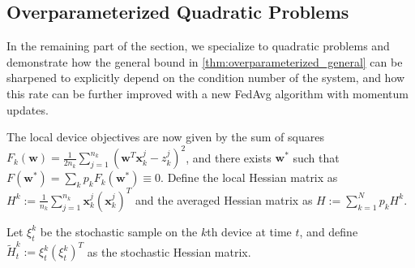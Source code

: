 \subsection{Overparameterized Quadratic Problems}

In the remaining part of the section, we specialize to quadratic problems
and demonstrate how the general bound in \ref{thm:overparameterized_general}
can be sharpened to explicitly depend on the condition number of the
system, and how this rate can be further improved with a new FedAvg
algorithm with momentum updates. 

The local device objectives are now given by the sum of squares $F_{k}(\mathbf{w})=\frac{1}{2n_{k}}\sum_{j=1}^{n_{k}}(\mathbf{w}^{T}\mathbf{x}_{k}^{j}-z_{k}^{j})^{2}$,
and there exists $\mathbf{w}^{\ast}$ such that $F(\mathbf{w}^{\ast})=\sum_{k}p_{k}F_{k}(\mathbf{w}^{\ast})\equiv0$.
Define the local Hessian matrix as $H^{k}:=\frac{1}{n_{k}}\sum_{j=1}^{n_{k}}\mathbf{x}_{k}^{j}(\mathbf{x}_{k}^{j})^{T}$
and the averaged Hessian matrix as $H:=\sum_{k=1}^{N}p_{k}H^{k}$.
\begin{comment}
In general $H$ has zero eigevalues. However, because the null space
of $H$ and range of $H$ are orthogonal, in our subsequence analysis
it suffices to project $\overline{\mathbf{w}}_{t}-\mathbf{w}^{\ast}$
onto the range of $H$, thus we may restrict to the non-zero eigenvalue
of $H$. We can use $\mathbf{w}^{\ast T}\mathbf{x}_{k}^{j}-z_{k}^{j}\equiv0$
to rewrite the local objectives as $F_{k}(\mathbf{w})=\frac{1}{2}\langle\mathbf{w}-\mathbf{w}^{\ast},H^{k}(\mathbf{w}-\mathbf{w}^{\ast})\rangle\equiv\frac{1}{2}\|\mathbf{w}-\mathbf{w}^{\ast}\|_{H^{k}}^{2}$
so that $F(\mathbf{w})=\frac{1}{2}\|\mathbf{w}-\mathbf{w}^{\ast}\|_{H}^{2}$.
\end{comment}
{} %
\begin{comment}
\begin{align*}
F_{k}(w) & =\frac{1}{2n_{k}}\sum_{j=1}^{n_{k}}(w^{T}x_{k,j}-z_{k,j}-(w^{\ast T}x_{k,j}-z_{k,j}))^{2}=\frac{1}{2n_{k}}\sum_{j=1}^{n_{k}}((w-w^{\ast})^{T}x_{k,j})^{2}\\
& =\frac{1}{2}\langle w-w^{\ast},H^{k}(w-w^{\ast})\rangle=\frac{1}{2}\|w-w^{\ast}\|_{H^{k}}^{2}
\end{align*}
\end{comment}
Let $\xi_{t}^{k}$ be the stochastic sample on the $k$th device at
time $t$, and define $\tilde{H}_{t}^{k}:=\xi_{t}^{k}(\xi_{t}^{k})^{T}$
as the stochastic Hessian matrix. %
\begin{comment}
Note that $\mathbb{E}\tilde{H}_{t}^{k}=\frac{1}{n_{k}}\sum_{j=1}^{n_{k}}\mathbf{x}_{k}^{j}(\mathbf{x}_{k}^{j})^{T}=H^{k}$
and $\mathbf{g}_{t,k}=\nabla F_{k}(\mathbf{w}_{t}^{k},\xi_{t}^{k})=\tilde{H}_{t}^{k}(\mathbf{w}_{t}^{k}-\mathbf{w}^{\ast})$
while $\mathbf{g}_{t}=\sum_{k=1}^{N}p_{k}\nabla F_{k}(\mathbf{w}_{t}^{k},\xi_{t}^{k})=\sum_{k=1}^{N}p_{k}\tilde{H}_{t}^{k}(\mathbf{w}_{t}^{k}-\mathbf{w}^{\ast})$.
\end{comment}
